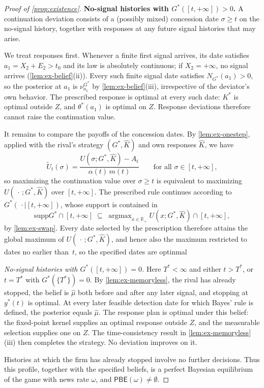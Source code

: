 \documentclass[12pt,reqno]{article}
\newcommand{\supp}{\mathrm{supp}}
\newcommand{\PBE}{\ensuremath{\mathsf{PBE}}}
\theoremstyle{definition} \newtheorem{example}{Example}
\theoremstyle{definition} \newtheorem{condition}{Condition}
\theoremstyle{definition} \newtheorem{corollary}{Corollary}
\theoremstyle{definition} \newtheorem{claim}{Claim}
\theoremstyle{definition} \newtheorem{definition}{Definition}
\theoremstyle{definition} \newtheorem{conjecture}{Conjecture}
\theoremstyle{definition} \newtheorem{Lemma}{Lemma}
\theoremstyle{definition} \newtheorem{lemma}{Lemma}
\theoremstyle{plain} \newtheorem{theorem}{Theorem}
\theoremstyle{definition} \newtheorem{assumption}{Assumption}
\theoremstyle{definition} \newtheorem*{assumptionnonumber}{Assumption}
\theoremstyle{definition} \newtheorem*{theoremNoNumber}{Proposition}
\theoremstyle{definition}
\theoremstyle{definition}\newtheorem{proposition}{Proposition}
\theoremstyle{definition} \newtheorem{result}{Result}
\theoremstyle{definition} \newtheorem*{definitionNoNumber}{Definition}
\theoremstyle{definition} \newtheorem{Definition}{Definition}
\theoremstyle{definition} \newtheorem*{DefinitionNoNumber}{Definition}
\theoremstyle{definition} \newtheorem*{fact}{Fact}
\theoremstyle{definition} \newtheorem*{property}{Property}
\DeclareMathOperator*{\argmax}{argmax}
\theoremstyle{definition} \newtheorem{remark}{Remark}
\begin{document}
\begin{proof}[Proof of \cref{prop:existence}]
\textbf{No-signal histories with $G^\ast([t,+\infty])>0$.}
A continuation deviation consists of a (possibly mixed) concession
date $\sigma\ge t$ on the no-signal history, together with responses
at any future signal histories that may arise.

We treat responses first. Whenever a finite first signal arrives, its
date satisfies $a_1=X_2+E_2>t_0$ and its law is absolutely
continuous; if $X_2=+\infty$, no signal arrives
(\cref{lem:ex-belief}(ii)). Every such finite signal date satisfies
$N_{G^\ast}(a_1)>0$, so the posterior at $a_1$ is
$\nu^{G^\ast}_{a_1}$ by \cref{lem:ex-belief}(iii), irrespective of
the deviator's own behavior. The prescribed response is
optimal at every such date: $K^\ast$ is optimal outside $Z$, and
$\theta^\ast(a_1)$ is optimal on $Z$. Response deviations therefore
cannot raise the continuation value.

It remains to compare the payoffs of the concession dates. By \cref{lem:ex-onestep},
applied with the rival's strategy $(G^\ast,\hat{K})$ and own
responses $\hat{K}$, we have
\[
  \widetilde{U}_t(\sigma)
  =\frac{U(\sigma;G^\ast,\hat{K})-A_t}{\alpha(t)\,m(t)}
  \qquad\text{for all }\sigma\in[t,+\infty],
\]
so maximizing the continuation value over $\sigma\ge t$ is equivalent
to maximizing $U(\,\cdot\,;G^\ast,\hat{K})$ over $[t,+\infty]$. The
prescribed rule continues according to
$G^\ast(\,\cdot\mid[t,+\infty])$, whose support is contained in
\[
  \supp G^\ast\cap[t,+\infty]
  \;\subseteq\;
  \argmax_{x\in\overline{\mathbb{R}}_+}U(x;G^\ast,\hat{K})
  \cap[t,+\infty],
\]
by \cref{lem:ex-swap}. Every date selected by the prescription
therefore attains the global maximum of
$U(\,\cdot\,;G^\ast,\hat{K})$, and hence also the maximum restricted
to dates no earlier than~$t$, so the specified dates are optinmal

\emph{No-signal histories with $G^\ast([t,+\infty])=0$.} Here $T^\ast<\infty$ and either $t>T^\ast$, or $t=T^\ast$ with $G^\ast(\{T^\ast\})=0$. By \cref{lem:ex-memoryless}, the rival has already stopped, the belief is $\hat\mu$ both before and after any later signal, and stopping at $y^\ast(t)$ is optimal. At every later feasible detection date for which Bayes' rule is defined, the posterior equals $\hat\mu$. The response plan is optimal under this belief: the fixed-point kernel supplies an optimal response outside $Z$, and the measurable selection supplies one on $Z$. The time-consistency result in \cref{lem:ex-memoryless}(iii) then completes the strategy. No deviation improves on it.

Histories at which the firm has already stopped involve no further decisions. Thus this profile, together with the specified beliefs, is a perfect Bayesian equilibrium of the game with news rate $\omega$, and $\PBE(\omega)\neq\emptyset$.
\end{proof}
\end{document}
